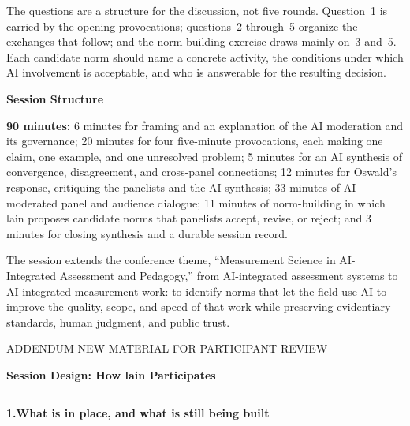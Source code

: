 \documentclass[11pt]{article}
\newcommand{\fieldlabel}[2][]{%
  \par\addvspace{1.25em}\Needspace{8\baselineskip}%
  \noindent\begin{minipage}{\linewidth}%
    {\NotoHeading\bfseries\large\color{ContentPrimary}#2}%
    \hfill{\normalfont\footnotesize\color{ContentSecondary}#1}%
  \end{minipage}\par
  \vspace{0.2em}{\color{BorderModerate}\rule{\linewidth}{0.4pt}}\par
  \vspace{0.55em}%
}
\begin{document}
The questions are a structure for the discussion, not five rounds. Question~1 is
carried by the opening provocations; questions~2 through~5 organize the
exchanges that follow; and the norm-building exercise draws mainly on~3 and~5.
Each candidate norm should name a concrete activity, the conditions under which
AI involvement is acceptable, and who is answerable for the resulting decision.

\fieldlabel{Session Structure}

\textbf{90 minutes:} 6 minutes for framing and an explanation of the AI
moderation and its governance; 20 minutes for four five-minute provocations,
each making one claim, one example, and one unresolved problem; 5 minutes for an AI synthesis of convergence,
disagreement, and cross-panel connections; 12 minutes for Oswald's response,
critiquing the panelists and the AI synthesis; 33 minutes of AI-moderated
panel and audience dialogue; 11 minutes of norm-building in which lain
proposes candidate norms that panelists accept, revise, or reject; and 3 minutes for
closing synthesis and a durable session record.

The session extends the conference theme, ``Measurement Science in
AI-Integrated Assessment and Pedagogy,'' from AI-integrated assessment systems
to AI-integrated measurement work: to identify norms that let the field use AI
to improve the quality, scope, and speed of that work while preserving
evidentiary standards, human judgment, and public trust.


\clearpage

{\sffamily\footnotesize\color{ContentSecondary}%
  \MakeUppercase{Addendum \quad\textbullet\quad New material for participant review}\par}

\vspace{0.5em}

{\NotoHeading\bfseries\color{ContentPrimary}\fontsize{19}{23}\selectfont
  Session Design: How lain Participates\par}

\vspace{0.5em}
{\color{BorderModerate}\rule{\linewidth}{1pt}}

\fieldlabel{1.\quad What is in place, and what is still being built}
\end{document}

